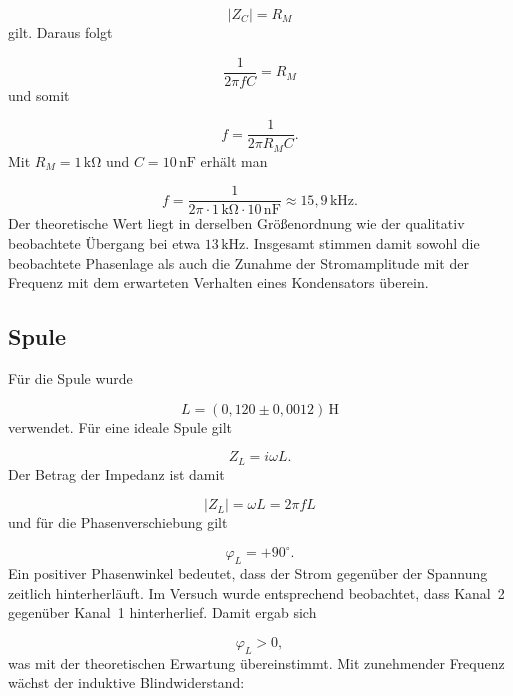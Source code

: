 \documentclass{report}
\begin{document}
\begin{equation}
|Z_C|=R_M
\end{equation}
\noindent
gilt. Daraus folgt

\begin{equation}
\frac{1}{2\pi f C}=R_M
\end{equation}
\noindent
und somit

\begin{equation}
f=
\frac{1}{2\pi R_M C}.
\end{equation}
\noindent
Mit $R_M=1\,\mathrm{k\Omega}$ und $C=10\,\mathrm{nF}$ erhält man

\begin{equation}
f
=
\frac{1}
{2\pi\cdot1\,\mathrm{k\Omega}\cdot10\,\mathrm{nF}}
\approx15{,}9\,\mathrm{kHz}.
\end{equation}
\noindent
Der theoretische Wert liegt in derselben Größenordnung wie der qualitativ beobachtete Übergang bei etwa $13\,\mathrm{kHz}$.
\noindent
Insgesamt stimmen damit sowohl die beobachtete Phasenlage als auch die Zunahme der Stromamplitude mit der Frequenz mit dem erwarteten Verhalten eines Kondensators überein.

\subsection{Spule}
\noindent
Für die Spule wurde

\begin{equation}
L=(0{,}120\pm0{,}0012)\,\mathrm{H}
\end{equation}
\noindent
verwendet.
\noindent
Für eine ideale Spule gilt

\begin{equation}
Z_L=i\omega L.
\end{equation}
\noindent
Der Betrag der Impedanz ist damit

\begin{equation}
|Z_L|=\omega L=2\pi fL
\end{equation}
\noindent
und für die Phasenverschiebung gilt

\begin{equation}
\boxed{\varphi_L=+90^\circ}.
\end{equation}
\noindent
Ein positiver Phasenwinkel bedeutet, dass der Strom gegenüber der Spannung zeitlich hinterherläuft.
\noindent
Im Versuch wurde entsprechend beobachtet, dass Kanal~2 gegenüber Kanal~1 hinterherlief. Damit ergab sich

\begin{equation}
\varphi_L>0,
\end{equation}
\noindent
was mit der theoretischen Erwartung übereinstimmt.
\noindent
Mit zunehmender Frequenz wächst der induktive Blindwiderstand:
\end{document}
